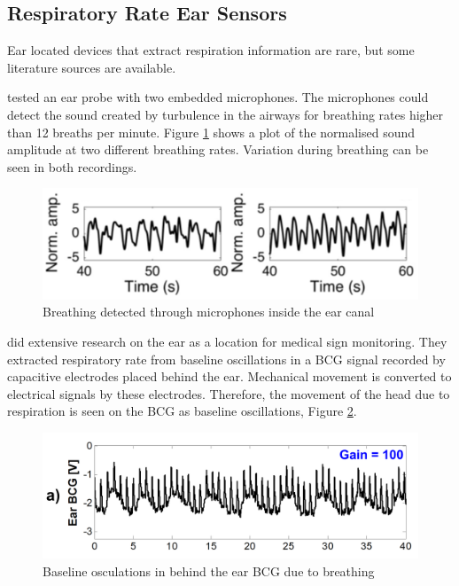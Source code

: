 \subsection{Respiratory Rate Ear Sensors}
Ear located devices that extract respiration information are rare, but some literature sources are available.

\medskip
\cite{goverdovsky2016hearables} tested an ear probe with two embedded microphones. The microphones could detect the sound created by turbulence in the airways for breathing rates higher than 12 breaths per minute. Figure \ref{fig:BreathingSound} shows a plot of the normalised sound amplitude at two different breathing rates. Variation during breathing can be seen in both recordings.

\begin{figure}[h]
   \centering
   \includegraphics[scale=0.8]{figs/BreathingSound}
   \caption{Breathing detected through microphones inside the ear canal \citep{goverdovsky2016hearables}}
   \label{fig:BreathingSound}
\end{figure}

\cite{da2010ear} did extensive research on the ear as a location for medical sign monitoring. They extracted respiratory rate from baseline oscillations in a BCG signal recorded by capacitive electrodes placed behind the ear. Mechanical movement is converted to electrical signals by these electrodes. Therefore, the movement of the head due to respiration is seen on the BCG as baseline oscillations, Figure \ref{fig:BCGbreathing}.

\begin{figure}[h]
   \centering
   \includegraphics[scale=0.3]{figs/BCGbreathing}
   \caption{Baseline osculations in behind the ear BCG due to breathing \citep{da2010ear}}
   \label{fig:BCGbreathing}
\end{figure}

